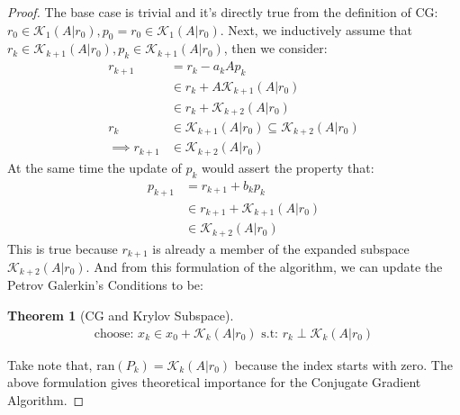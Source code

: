 \documentclass[]{article}
\theoremstyle{definition}
\newtheorem{theorem}{Theorem}            %
\begin{document}
            \begin{proof}
                The base case is trivial and it's directly true from the definition of CG: $r_0 \in \mathcal K_1(A|r_0), p_0 = r_0 \in \mathcal K_1(A|r_0)$. Next, we inductively assume that $r_k \in \mathcal K_{k + 1}(A|r_0), p_k \in \mathcal K_{k + 1}(A|r_0)$, then we consider: 
                \begin{align}
                    r_{k + 1} &= r_k - a_kAp_k
                    \\
                    &\in r_k + A\mathcal K_{k + 1}(A|r_0)
                    \\
                    &\in r_k + \mathcal K_{k + 2}(A|r_0)
                    \\
                    r_k 
                    &\in 
                    \mathcal K_{k + 1}(A|r_0) \subseteq \mathcal K_{k + 2}(A|r_0)
                    \\
                    \implies r_{k + 1}
                    &\in 
                    \mathcal K_{k + 2}(A|r_0)
                \end{align}
                At the same time the update of $p_k$ would assert the property that: 
                \begin{align}
                    p_{k + 1} &= r_{k + 1} + b_kp_k
                    \\
                    &\in 
                    r_{k + 1} + \mathcal K_{k + 1}(A|r_0)
                    \\
                    &\in \mathcal K_{k + 2}(A|r_0)
                \end{align}
                This is true because $r_{k + 1}$ is already a member of the expanded subspace $\mathcal K_{k + 2}(A|r_0)$. And from this formulation of the algorithm, we can update the Petrov Galerkin's Conditions to be: 
                \begin{theorem}[CG and Krylov Subspace]\label{theorem:CG_and_Krylov_Subspace}
                    \begin{align}
                        \text{choose: } x_k\in x_0 + \mathcal K_{k}(A|r_0) \text{ s.t: } r_k \perp \mathcal K_{k}(A|r_0)
                    \end{align}    
                \end{theorem}
                Take note that, $\text{ran}(P_k) = \mathcal K_k(A|r_0)$ because the index starts with zero. The above formulation gives theoretical importance for the Conjugate Gradient Algorithm. 
            \end{proof}
\end{document}
